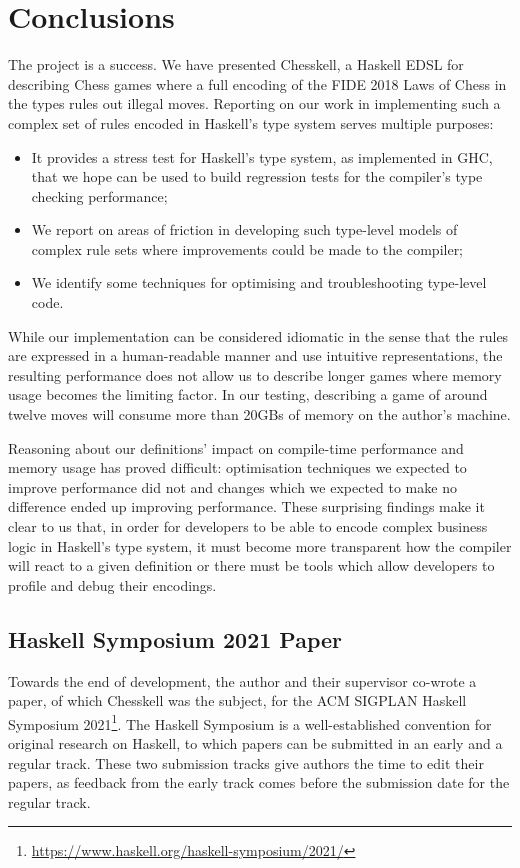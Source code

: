 \chapter{Conclusions}

The project is a success. We have presented Chesskell, a Haskell EDSL for describing Chess games where a full encoding of the FIDE 2018 Laws of Chess in the types rules out illegal moves. Reporting on our work in implementing such a complex set of rules encoded in Haskell's type system serves multiple purposes:

\begin{itemize}
    \item It provides a stress test for Haskell's type system, as implemented in GHC, that we hope can be used to build regression tests for the compiler's type checking performance;
    \item We report on areas of friction in developing such type-level models of complex rule sets where improvements could be made to the compiler;
    \item We identify some techniques for optimising and troubleshooting type-level code.
\end{itemize}

While our implementation can be considered idiomatic in the sense that the rules are expressed in a human-readable manner and use intuitive representations, the resulting performance does not allow us to describe longer games where memory usage becomes the limiting factor. In our testing, describing a game of around twelve moves will consume more than 20GBs of memory on the author's machine.

Reasoning about our definitions' impact on compile-time performance and memory usage has proved difficult: optimisation techniques we expected to improve performance did not and changes which we expected to make no difference ended up improving performance. These surprising findings make it clear to us that, in order for developers to be able to encode complex business logic in Haskell's type system, it must become more transparent how the compiler will react to a given definition or there must be tools which allow developers to profile and debug their encodings.

\section{Haskell Symposium 2021 Paper}

Towards the end of development, the author and their supervisor co-wrote a paper, of which Chesskell was the subject, for the ACM SIGPLAN Haskell Symposium 2021\footnote{\url{https://www.haskell.org/haskell-symposium/2021/}}. The Haskell Symposium is a well-established convention for original research on Haskell, to which papers can be submitted in an early and a regular track. These two submission tracks give authors the time to edit their papers, as feedback from the early track comes before the submission date for the regular track.

